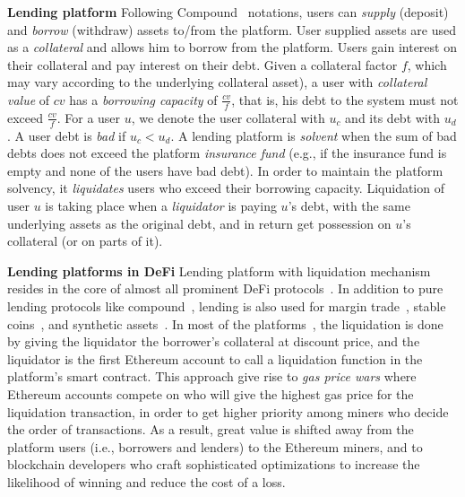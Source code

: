 \documentclass{article}
\begin{document}
\noindent\textbf{Lending platform} Following Compound~\cite{compound} notations, users can \emph{supply} (deposit) and \emph{borrow} (withdraw) assets to/from the platform.
User supplied assets are used as a \emph{collateral} and allows him to borrow from the platform.
Users gain interest on their collateral and pay interest on their debt.
Given a collateral factor $f$, which may vary according to the underlying collateral asset), a user with \emph{collateral value} of $cv$ has a \emph{borrowing capacity} of $\frac{cv}{f}$, that is, his debt to the system must not exceed $\frac{cv}{f}$.
For a user $u$, we denote the user collateral with $u_c$ and its debt with $u_d$. A user debt is \emph{bad} if $u_c < u_d$.
A lending platform is \emph{solvent} when the sum of bad debts does not exceed the platform \emph{insurance fund} (e.g., if the insurance fund is empty and none of the users have bad debt).
In order to maintain the platform solvency, it \emph{liquidates} users who exceed their borrowing capacity.
Liquidation of user $u$ is taking place when a \emph{liquidator} is paying $u$'s debt, with the same underlying assets as the original debt, and in return get possession on $u$'s collateral (or on parts of it).  

\noindent\textbf{Lending platforms in DeFi}
Lending platform with liquidation mechanism resides in the core of almost all prominent DeFi protocols~\cite{defiPulse}.
In addition to pure lending protocols like compound~\cite{compound}, lending is also used for margin trade~\cite{dydx}, stable coins~\cite{daiv2}, and synthetic assets~\cite{synthetix}.
In most of the platforms~\cite{compound,dydx,sai}, the liquidation is done by giving the liquidator the borrower's collateral at discount price, and the liquidator is the first Ethereum account to call a liquidation function in the platform's smart contract.
This approach give rise to \emph{gas price wars} where Ethereum accounts compete on who will give the highest gas price for the liquidation transaction, in order to get higher priority among miners who decide the order of transactions.
As a result, great value is shifted away from the platform users (i.e., borrowers and lenders) to the Ethereum miners, and to blockchain developers who craft sophisticated optimizations to increase the likelihood of winning and reduce the cost of a loss.
\end{document}
